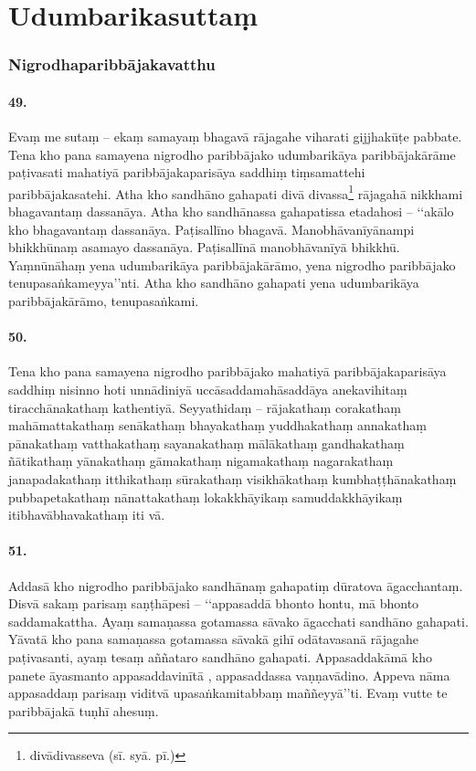 \section{Udumbarikasuttaṃ}

\subsubsection{Nigrodhaparibbājakavatthu}

\paragraph{49.} Evaṃ me sutaṃ – ekaṃ samayaṃ bhagavā rājagahe viharati gijjhakūṭe pabbate. Tena kho pana samayena nigrodho paribbājako udumbarikāya paribbājakārāme paṭivasati mahatiyā paribbājakaparisāya saddhiṃ tiṃsamattehi paribbājakasatehi. Atha kho sandhāno gahapati divā divassa\footnote{divādivasseva (sī. syā. pī.)} rājagahā nikkhami bhagavantaṃ dassanāya. Atha kho sandhānassa gahapatissa etadahosi – ‘‘akālo kho bhagavantaṃ dassanāya. Paṭisallīno bhagavā. Manobhāvanīyānampi bhikkhūnaṃ asamayo dassanāya. Paṭisallīnā manobhāvanīyā bhikkhū. Yaṃnūnāhaṃ yena udumbarikāya paribbājakārāmo, yena nigrodho paribbājako tenupasaṅkameyya’’nti. Atha kho sandhāno gahapati yena udumbarikāya paribbājakārāmo, tenupasaṅkami.

\paragraph{50.} Tena kho pana samayena nigrodho paribbājako mahatiyā paribbājakaparisāya saddhiṃ nisinno hoti unnādiniyā uccāsaddamahāsaddāya anekavihitaṃ tiracchānakathaṃ kathentiyā. Seyyathidaṃ – rājakathaṃ corakathaṃ mahāmattakathaṃ senākathaṃ bhayakathaṃ yuddhakathaṃ annakathaṃ pānakathaṃ vatthakathaṃ sayanakathaṃ mālākathaṃ gandhakathaṃ ñātikathaṃ yānakathaṃ gāmakathaṃ nigamakathaṃ nagarakathaṃ janapadakathaṃ itthikathaṃ sūrakathaṃ visikhākathaṃ kumbhaṭṭhānakathaṃ pubbapetakathaṃ nānattakathaṃ lokakkhāyikaṃ samuddakkhāyikaṃ itibhavābhavakathaṃ iti vā.

\paragraph{51.} Addasā kho nigrodho paribbājako sandhānaṃ gahapatiṃ dūratova āgacchantaṃ. Disvā sakaṃ parisaṃ saṇṭhāpesi – ‘‘appasaddā bhonto hontu, mā bhonto saddamakattha. Ayaṃ samaṇassa gotamassa sāvako āgacchati sandhāno gahapati. Yāvatā kho pana samaṇassa gotamassa sāvakā gihī odātavasanā rājagahe paṭivasanti, ayaṃ tesaṃ aññataro sandhāno gahapati. Appasaddakāmā kho panete āyasmanto appasaddavinītā , appasaddassa vaṇṇavādino. Appeva nāma appasaddaṃ parisaṃ viditvā upasaṅkamitabbaṃ maññeyyā’’ti. Evaṃ vutte te paribbājakā tuṇhī ahesuṃ.

